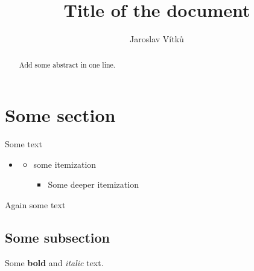 \documentclass[journal,onecolumn]{IEEEtrancz}
\begin{document}
\title{Title of the document}
\author{Jaroslav Vítků}

\maketitle

\begin{abstract}
	Add some abstract in one line.
\end{abstract}

\IEEEpeerreviewmaketitle



\section{Some section}
Some text
\begin{itemize}
	\item 
	\begin{itemize}
		\item some itemization
		\begin{itemize}
			\item Some deeper itemization
		\end{itemize}
	\end{itemize}
\end{itemize}
Again some text


\subsection{Some subsection}
Some \textbf{bold} and \textit{italic} text.
\end{document}
